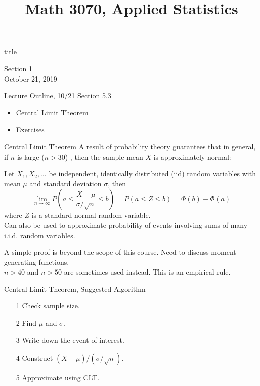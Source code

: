 \documentclass[t,handout]{beamer}
\title{Math 3070, Applied Statistics}
\newcommand{\nl}[1]{\vspace{#1 em}}
\begin{document}
\begin{frame}[c]
    \begin{beamercolorbox}[rounded=true,wd=\textwidth,center]{title}
        \inserttitle
    \end{beamercolorbox}
    \begin{center}
        Section 1\\
        \nl{0.5}
        October 21, 2019
    \end{center}
\end{frame}
\begin{frame}[c]{Lecture Outline, 10/21}
    Section 5.3
    \begin{itemize}
        \item Central Limit Theorem
        \item Exercises
    \end{itemize}
\end{frame}
\begin{frame}{Central Limit Theorem}
    A result of probability theory guarantees that in general, if $n$ is large ($n>30$) , then the sample mean $\overline{X}$ is approximately normal: 
    \begin{block}{}
    Let $X_1,X_2,\dots$ be independent, identically distributed (iid) random variables with mean $\mu$ and standard deviation $\sigma$, then
    $$\lim_{n\to\infty} P\left(a \leq \frac{\overline{X}-\mu}{\sigma/\sqrt{n}} \leq b\right) = P(a \leq Z\leq b)=\Phi(b)-\Phi(a)$$
    where $Z$ is a standard normal random variable.\\
    Can also be used to approximate probability of events involving sums of many i.i.d. random variables.
    \end{block}
    A simple proof is beyond the scope of this course. Need to discuss moment generating functions.\\
    \nl{0.5}
    $n>40$ and $n>50$ are sometimes used instead. This is an empirical rule.
\end{frame}
\begin{frame}[c]{Central Limit Theorem, Suggested Algorithm}
    \begin{itemize}
        \item[1] Check sample size.
        \item[2]  Find $\mu$ and $\sigma$.
        \item[3]  Write down the event of interest.
        \item[4]  Construct $(\overline{X}-\mu)/(\sigma/\sqrt{n})$.
        \item[5] Approximate using CLT.
    \end{itemize}
\end{frame}
\end{document}
